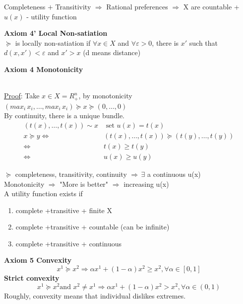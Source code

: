 \documentclass[letterpaper,13pt,single,pdftex]{scrartcl}
\begin{document}
Completeness $+$ Transitivity $\Rightarrow$ Rational preferences $\Rightarrow$ X are countable + $u(x)$ - utility function\\



\par \textbf{Axiom 4' Local Non-satiation}
\\$\succeq$ is locally non-satiation if $\forall x\in X $ and $\forall \varepsilon > 0$, there is $x'$ such that $d(x,x') < \varepsilon$ and $x'>x$ (d means distance)\\

\par \textbf{Axiom 4 Monotonicity}
 \\



 \\
 \underline{Proof}:
 Take $x\in X = R^n_+$, by monotonicity\\
 $(max_i \,x_i, \dots, max_i\, x_i)\succeq x \succeq(0, \dots, 0) $\\
 By continuity, there is a unique bundle. 
\begin{align*}
    (t(x), \dots,t(x)) \sim x &\text{   set }u(x) = t(x)\\
    x\succeq y \Leftrightarrow &(t(x), \dots, t(x)) \succeq (t(y),\dots,t(y))\\
    \Leftrightarrow & t(x)\ge t(y)\\
    \Leftrightarrow & u(x)\ge u(y)
\end{align*} 

$\succeq$ completeness, transitivity, continuity $\Rightarrow\, \exists $ a continuous u(x) \\
Monotonicity $\Rightarrow$ "More is better" $\Rightarrow$ increasing u(x)\\
A utility function exists if 
\begin{enumerate}
    \item complete +transitive + finite X
    \item complete +transitive + countable (can be infinite)
    \item complete +transitive + continuous 
\end{enumerate}
\textbf{Axiom 5 Convexity}
 \[x^1 \succeq x^2 \Rightarrow \alpha x^1+(1-\alpha)x^2 \ge x^2, \forall \alpha \in [0,1]\]
\textbf{Strict convexity}
 \[ x^1 \succeq x^2 \text{and } x^2 \ne x^1 \Rightarrow \alpha x^1+(1-\alpha)x^2 > x^2, \forall \alpha \in (0,1)\]
Roughly, convexity means that individual dislikes extremes.\\
\end{document}
